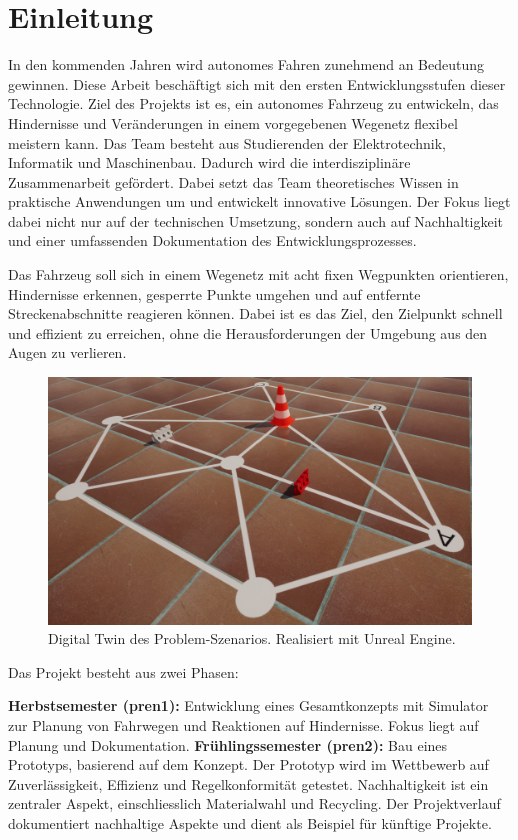 \documentclass[../main.tex]{subfiles}
\begin{document}
\newpage
\section{Einleitung}

In den kommenden Jahren wird autonomes Fahren zunehmend an Bedeutung gewinnen. Diese Arbeit beschäftigt sich mit den ersten Entwicklungsstufen dieser Technologie. Ziel des Projekts ist es, ein autonomes Fahrzeug zu entwickeln, das Hindernisse und Veränderungen in einem vorgegebenen Wegenetz flexibel meistern kann. Das Team besteht aus Studierenden der Elektrotechnik, Informatik und Maschinenbau. Dadurch wird die interdisziplinäre Zusammenarbeit gefördert. Dabei setzt das Team theoretisches Wissen in praktische Anwendungen um und entwickelt innovative Lösungen. Der Fokus liegt dabei nicht nur auf der technischen Umsetzung, sondern auch auf Nachhaltigkeit und einer umfassenden Dokumentation des Entwicklungsprozesses.

Das Fahrzeug soll sich in einem Wegenetz mit acht fixen Wegpunkten orientieren, Hindernisse erkennen, gesperrte Punkte umgehen und auf entfernte Streckenabschnitte reagieren können. Dabei ist es das Ziel, den Zielpunkt schnell und effizient zu erreichen, ohne die Herausforderungen der Umgebung aus den Augen zu verlieren.
\begin{figure}[H]
    \centering
    \includegraphics[width=0.75\linewidth]{img/unrealengine/unreal.png}
    \caption{Digital Twin des Problem-Szenarios. Realisiert mit Unreal Engine\protect\footnotemark.}
    \label{intro_digital_twin}
\end{figure}
Das Projekt besteht aus zwei Phasen:

\textbf{Herbstsemester (\acrshort{pren1}):} Entwicklung eines Gesamtkonzepts mit Simulator zur Planung von Fahrwegen und Reaktionen auf Hindernisse. Fokus liegt auf Planung und Dokumentation.
\textbf{Frühlingssemester (\acrshort{pren2}):} Bau eines Prototyps, basierend auf dem Konzept. Der Prototyp wird im Wettbewerb auf Zuverlässigkeit, Effizienz und Regelkonformität getestet.
Nachhaltigkeit ist ein zentraler Aspekt, einschliesslich Materialwahl und Recycling. Der Projektverlauf dokumentiert nachhaltige Aspekte und dient als Beispiel für künftige Projekte.
\end{document}
